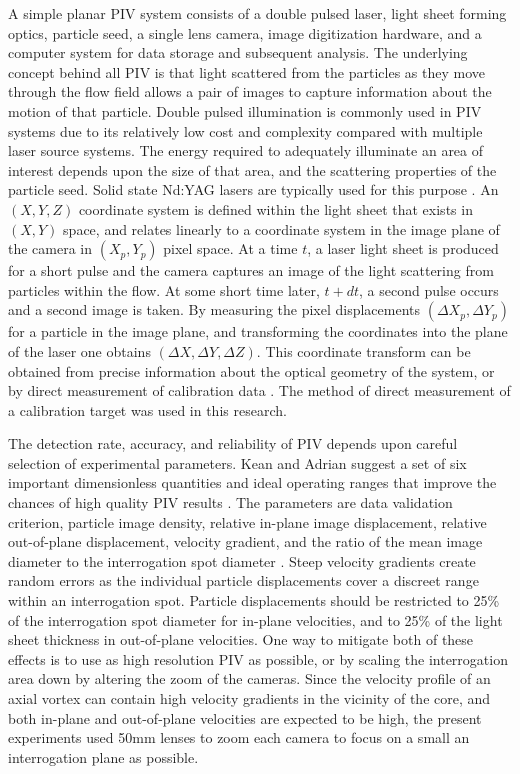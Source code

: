 A simple planar PIV system consists of a double pulsed laser, light sheet 
forming optics, particle seed, a single lens camera, image digitization 
hardware, and a computer system for data storage and subsequent analysis. The 
underlying concept behind all PIV is that light scattered from the particles as 
they move through the flow field allows a pair of images to capture information 
about the motion of that particle. Double pulsed illumination is commonly used 
in PIV systems due to its relatively low cost and complexity compared with 
multiple laser source systems. The energy required to adequately illuminate an 
area of interest depends upon the size of that area, and the scattering 
properties of the particle seed. Solid state Nd:YAG lasers are typically used 
for this purpose \cite{adrian2011}. An $(X, Y, Z)$ coordinate system 
is defined 
within the light sheet that exists in $(X, Y)$ space, and relates linearly to a 
coordinate system in the image plane of the camera in $(X_p, Y_p)$ pixel space. 
At a time $t$, a laser light sheet is produced for a short pulse and the camera 
captures an image of the light scattering from particles within the flow. At 
some short time later, $t + dt$, a second pulse occurs and a second image is 
taken. By measuring the pixel displacements $(\Delta X_p, \Delta Y_p)$ for a 
particle in the image plane, and transforming the coordinates into the plane of 
the laser one obtains $(\Delta X, \Delta Y, \Delta Z)$. This coordinate 
transform can be obtained from precise information about the optical geometry 
of the system, or by direct measurement of calibration data \cite{fouras2007}.
The method of direct measurement of a calibration target was used in this 
research. 

The detection rate, accuracy, and reliability of PIV depends upon careful 
selection of experimental parameters. Kean and Adrian suggest a set of six 
important dimensionless quantities and ideal operating ranges that improve the 
chances of high quality PIV results . The parameters 
are data validation criterion, particle image density, relative in-plane image 
displacement, relative out-of-plane displacement, velocity gradient, and the 
ratio of the mean image diameter to the interrogation spot diameter 
\cite{kean1990,kean1991}. Steep velocity gradients create random errors as the 
individual particle displacements cover a discreet range within an 
interrogation spot. Particle displacements should be restricted to 25\% of the 
interrogation spot diameter for in-plane velocities, and to 25\% of the light 
sheet thickness in out-of-plane velocities. One way to mitigate both of these 
effects is to use as high resolution PIV as possible, or by scaling the 
interrogation area down by altering the zoom of the cameras. Since the velocity 
profile of an axial vortex can contain high velocity gradients in the vicinity 
of the core, and both in-plane and out-of-plane velocities are expected to be 
high, the present experiments used 50mm lenses to zoom each camera to 
focus on a small an interrogation plane as possible.

